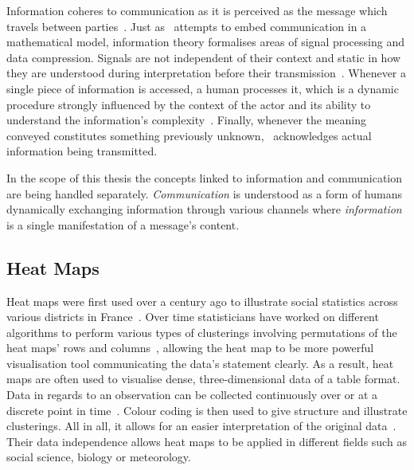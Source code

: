 Information coheres to communication as it is perceived as the message which travels between parties~\citep{floridiinformationintro}. Just as~\citet{savage2011informationtheory} attempts to embed communication in a mathematical model, information theory formalises areas of signal processing and data compression. Signals are not independent of their context and static in how they are understood during interpretation before their transmission~\citep{vigo2011representionalinformation}. Whenever a single piece of information is accessed, a human processes it, which is a dynamic procedure strongly influenced by the context of the actor and its ability to understand the information's complexity~\citep{vigo2011representionalinformation}. Finally, whenever the meaning conveyed constitutes something previously unknown,~\citet{gleick2012theinformation} acknowledges actual information being transmitted.

In the scope of this thesis the concepts linked to information and communication are being handled separately. \textit{Communication} is understood as a form of humans dynamically exchanging information through various channels where \textit{information} is a single manifestation of a message's content.

\subsection{Heat Maps}

Heat maps were first used over a century ago to illustrate social statistics across various districts in France~\citep{friendly09thehistory}. 
Over time statisticians have worked on different algorithms to perform various types of clusterings involving permutations of the heat maps' rows and columns~\citep{friendly09thehistory}, allowing the heat map to be more powerful visualisation tool communicating the data's statement clearly.
As a result, heat maps are often used to visualise dense, three-dimensional data of a table format. Data in regards to an observation can be collected continuously over or at a discrete point in time~\citep{gehlensborg2012heatmaps}.
Colour coding is then used to give structure and illustrate clusterings. All in all, it allows for an easier interpretation of the original data~\citep{gehlensborg2012heatmaps}. Their data independence allows heat maps to be applied in different fields such as social science, biology or meteorology.

